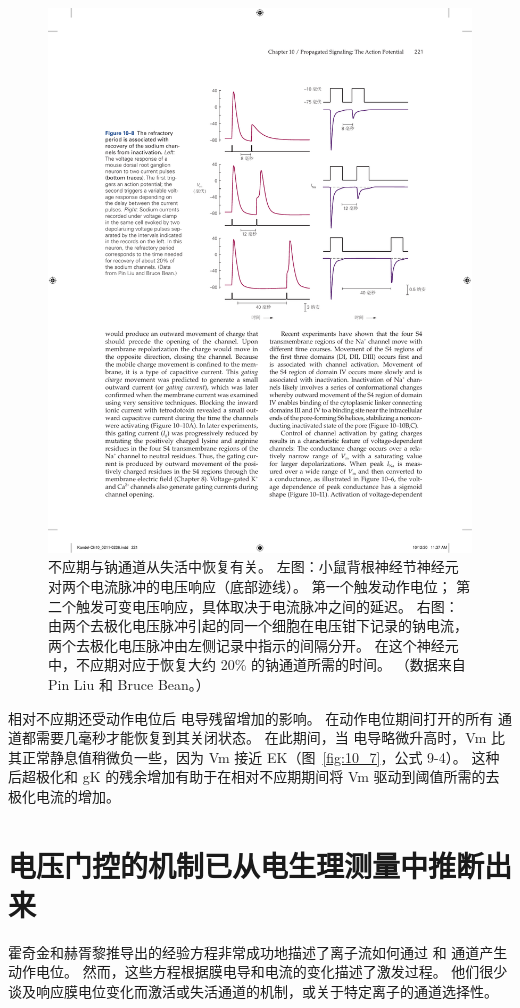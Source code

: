 \begin{figure}[htbp]
	\centering
	\includegraphics[width=0.7\linewidth]{chap10/fig_10_8}
	\caption{不应期与钠通道从失活中恢复有关。 左图：小鼠背根神经节神经元对两个电流脉冲的电压响应（底部迹线）。 第一个触发动作电位； 第二个触发可变电压响应，具体取决于电流脉冲之间的延迟。 右图：由两个去极化电压脉冲引起的同一个细胞在电压钳下记录的钠电流，两个去极化电压脉冲由左侧记录中指示的间隔分开。 在这个神经元中，不应期对应于恢复大约 20\% 的钠通道所需的时间。 （数据来自 Pin Liu 和 Bruce Bean。）}
	\label{fig:10_8}
\end{figure}


相对不应期还受动作电位后  电导残留增加的影响。 
在动作电位期间打开的所有  通道都需要几毫秒才能恢复到其关闭状态。
在此期间，当  电导略微升高时，Vm 比其正常静息值稍微负一些，因为 Vm 接近 EK（图~\ref{fig:10_7}，公式 9-4）。 
这种后超极化和 gK 的残余增加有助于在相对不应期期间将 Vm 驱动到阈值所需的去极化电流的增加。




\section{电压门控的机制已从电生理测量中推断出来}

霍奇金和赫胥黎推导出的经验方程非常成功地描述了离子流如何通过  和  通道产生动作电位。
然而，这些方程根据膜电导和电流的变化描述了激发过程。
他们很少谈及响应膜电位变化而激活或失活通道的机制，或关于特定离子的通道选择性。


